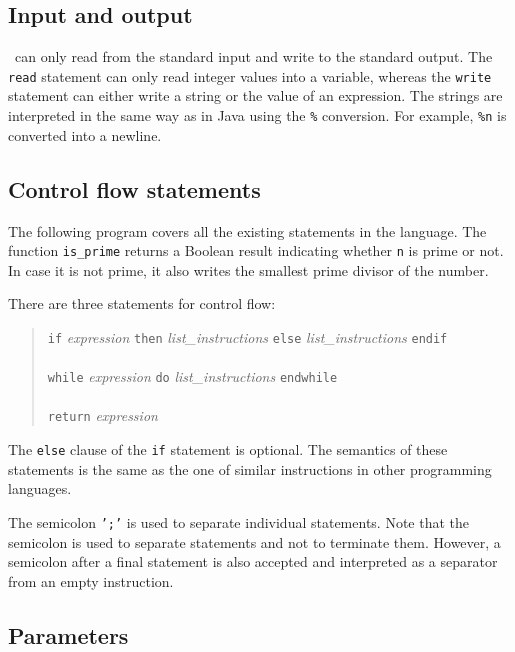 \subsection{Input and output}

\asl\ can only read from the standard input and write to the standard
output. The \texttt{read} statement can only read integer values into
a variable, whereas the \texttt{write} statement can either write
a string or the value of an expression. The strings are interpreted
in the same way as in Java using the \texttt{\%} conversion. For example,
\texttt{\%n} is converted into a newline.

\subsection{Control flow statements}

The following program covers all the existing statements in the language.
The function \texttt{is\_prime} returns a Boolean result indicating
whether \texttt{n} is prime or not. In case it is not prime, it also writes
the smallest prime divisor of the number.



\noindent There are three statements for control flow:
\begin{quote}
\texttt{if} \emph{expression} \texttt{then} \emph{list\_instructions}
\texttt{else} \emph{list\_instructions} \texttt{endif}\\
\\
\texttt{while} \emph{expression} \texttt{do} \emph{list\_instructions}
\texttt{endwhile}\\
\\
\texttt{return} \emph{expression}
\end{quote}

\noindent The \texttt{else} clause of the \texttt{if} statement is optional.
The semantics of these statements is the same as the one of
similar instructions in other programming languages.

The semicolon \texttt{';'} is used to separate individual statements.
Note that the semicolon is used to separate statements and not to
terminate them. However, a semicolon after a final statement is also
accepted and interpreted as a separator from an empty instruction.

\subsection{Parameters}

